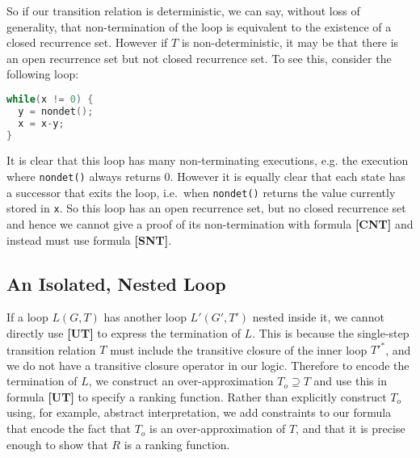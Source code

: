 \documentclass[preprint]{sigplanconf}
\theoremstyle{definition}
\begin{document}
So if our transition relation is deterministic, we can say, without
loss of generality, that non-termination of the loop is equivalent
to the existence of a closed recurrence set.  However if $T$ is
non-deterministic, it may be that there is an open recurrence
set but not closed recurrence set.  To see this, consider the following
loop:
%
\begin{lstlisting}[language=C]
while(x != 0) {
  y = nondet();
  x = x-y;
}
\end{lstlisting}

It is clear that this loop has many non-terminating executions,
e.g. the execution where \lstinline!nondet()! always returns 0.
However it is equally clear that each state has a successor
that exits the loop, i.e.~when \lstinline|nondet()| returns
the value currently stored in \lstinline|x|.  So this loop
has an open recurrence set, but no closed recurrence set
and hence we cannot give a proof of its non-termination
with formula {\bf [CNT]} and instead must use formula {\bf [SNT]}.

% 

\subsection{An Isolated, Nested Loop}
 If a loop $L(G, T)$ has another loop $L'(G', T')$ nested inside it, we cannot directly use {\bf [UT]}
to express the termination of $L$.  This is because the single-step transition relation $T$ must
include the transitive closure of the inner loop $T'^*$, and we do not have a transitive closure
operator in our logic.  Therefore to encode the termination of $L$, we construct an over-approximation
$T_o \supseteq T$ and use this in formula {\bf [UT]} to specify a ranking function.
Rather than explicitly construct $T_o$ using, for example, abstract interpretation, we add constraints to
our formula that encode the fact that $T_o$ is an over-approximation of $T$, and that it is
precise enough to show that $R$ is a ranking function.
\end{document}
